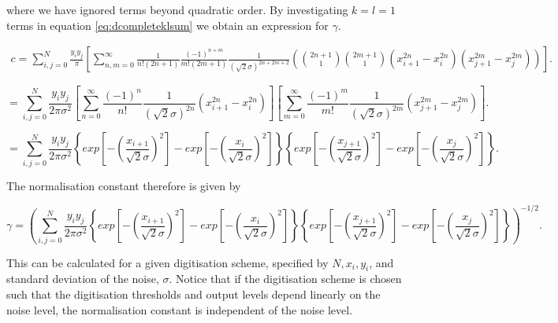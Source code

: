 \documentclass[a4paper,fleqn,usenatbib]{mnras}
\begin{document}
where we have ignored terms beyond quadratic order. By investigating $k=l=1$ terms in equation \ref{eq:dcompleteklsum} we obtain an expression for $\gamma$.

\begin{equation}
\begin{aligned}
c = \sum_{i,j=0}^N  \frac{y_i y_j}{\pi} \left[ \sum_{n,m = 0}^\infty \frac{1}{n! (2n+1)} \frac{(-1)^{n+m}}{m! (2m+1)} \frac{1}{(\sqrt{2}\sigma)^{2n+2m+2}} \left( {2n+1 \choose 1} {2m+1 \choose 1} ( x_{i+1}^{2n} - x_{i}^{2n} ) ( x_{j+1}^{2m} - x_{j}^{2m} ) \right) \right] .
\end{aligned}
\end{equation}

\begin{equation}
= \sum_{i,j=0}^N \frac{y_i y_j}{2\pi\sigma^2} \left[ \sum_{n = 0}^\infty \frac{(-1)^n}{n!} \frac{1}{(\sqrt{2}\sigma)^{2n}}  ( x_{i+1}^{2n} - x_{i}^{2n} ) \right] \left[ \sum_{m = 0}^\infty \frac{(-1)^m}{m!} \frac{1}{(\sqrt{2}\sigma)^{2m}} ( x_{j+1}^{2m} - x_{j}^{2m} ) \right].
\end{equation}

\begin{equation}
= \sum_{i,j=0}^N \frac{y_i y_j}{2\pi\sigma^2} \left\{ exp \left[ - \left(\frac{x_{i+1}}{\sqrt{2}\sigma} \right)^2 \right] - exp \left[ - \left(\frac{x_{i}}{\sqrt{2}\sigma} \right)^2 \right] \right\} \left\{ exp \left[ - \left(\frac{x_{j+1}}{\sqrt{2}\sigma} \right)^2 \right] - exp \left[ - \left(\frac{x_{j}}{\sqrt{2}\sigma} \right)^2 \right] \right\} .
\end{equation}

The normalisation constant therefore is given by

\begin{equation}
\gamma = \left( \sum_{i,j=0}^N \frac{y_i y_j}{2\pi\sigma^2} \left\{ exp \left[ - \left(\frac{x_{i+1}}{\sqrt{2}\sigma} \right)^2 \right] - exp \left[ - \left(\frac{x_{i}}{\sqrt{2}\sigma} \right)^2 \right] \right\} \left\{ exp \left[ - \left(\frac{x_{j+1}}{\sqrt{2}\sigma} \right)^2 \right] - exp \left[ - \left(\frac{x_{j}}{\sqrt{2}\sigma} \right)^2 \right] \right\} \right)^{-1/2} .
\end{equation}

This can be calculated for a given digitisation scheme, specified by $N, x_i, y_i$, and standard deviation of the noise, $\sigma$. Notice that if the digitisation scheme is chosen such that the digitisation thresholds and output levels depend linearly on the noise level, the normalisation constant is independent of the noise level.

\bsp	%
\label{lastpage}
\end{document}

